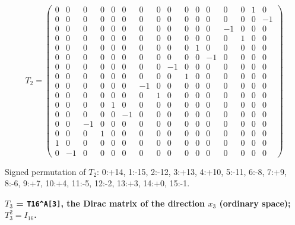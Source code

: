 \documentclass[
  10pt,
]{article}
\begin{document}
\[
T_2 = \scriptstyle \begin{pmatrix} 0 & 0 & 0 & 0 & 0 & 0 & 0 & 0 & 0 & 0 & 0 & 0 & 0 & 0 & 1 & 0 \\ 0 & 0 & 0 & 0 & 0 & 0 & 0 & 0 & 0 & 0 & 0 & 0 & 0 & 0 & 0 & -1 \\ 0 & 0 & 0 & 0 & 0 & 0 & 0 & 0 & 0 & 0 & 0 & 0 & -1 & 0 & 0 & 0 \\ 0 & 0 & 0 & 0 & 0 & 0 & 0 & 0 & 0 & 0 & 0 & 0 & 0 & 1 & 0 & 0 \\ 0 & 0 & 0 & 0 & 0 & 0 & 0 & 0 & 0 & 0 & 1 & 0 & 0 & 0 & 0 & 0 \\ 0 & 0 & 0 & 0 & 0 & 0 & 0 & 0 & 0 & 0 & 0 & -1 & 0 & 0 & 0 & 0 \\ 0 & 0 & 0 & 0 & 0 & 0 & 0 & 0 & -1 & 0 & 0 & 0 & 0 & 0 & 0 & 0 \\ 0 & 0 & 0 & 0 & 0 & 0 & 0 & 0 & 0 & 1 & 0 & 0 & 0 & 0 & 0 & 0 \\ 0 & 0 & 0 & 0 & 0 & 0 & -1 & 0 & 0 & 0 & 0 & 0 & 0 & 0 & 0 & 0 \\ 0 & 0 & 0 & 0 & 0 & 0 & 0 & 1 & 0 & 0 & 0 & 0 & 0 & 0 & 0 & 0 \\ 0 & 0 & 0 & 0 & 1 & 0 & 0 & 0 & 0 & 0 & 0 & 0 & 0 & 0 & 0 & 0 \\ 0 & 0 & 0 & 0 & 0 & -1 & 0 & 0 & 0 & 0 & 0 & 0 & 0 & 0 & 0 & 0 \\ 0 & 0 & -1 & 0 & 0 & 0 & 0 & 0 & 0 & 0 & 0 & 0 & 0 & 0 & 0 & 0 \\ 0 & 0 & 0 & 1 & 0 & 0 & 0 & 0 & 0 & 0 & 0 & 0 & 0 & 0 & 0 & 0 \\ 1 & 0 & 0 & 0 & 0 & 0 & 0 & 0 & 0 & 0 & 0 & 0 & 0 & 0 & 0 & 0 \\ 0 & -1 & 0 & 0 & 0 & 0 & 0 & 0 & 0 & 0 & 0 & 0 & 0 & 0 & 0 & 0 \end{pmatrix}
\]

Signed permutation of \(T_2\): 0:+14, 1:-15, 2:-12, 3:+13, 4:+10, 5:-11,
6:-8, 7:+9, 8:-6, 9:+7, 10:+4, 11:-5, 12:-2, 13:+3, 14:+0, 15:-1.

\textbf{\(T_3\) = \texttt{T16\^{}A{[}3{]}}, the Dirac matrix of the
direction \(x_3\) (ordinary space); \(T_3^2 = I_{16}\).}
\end{document}

